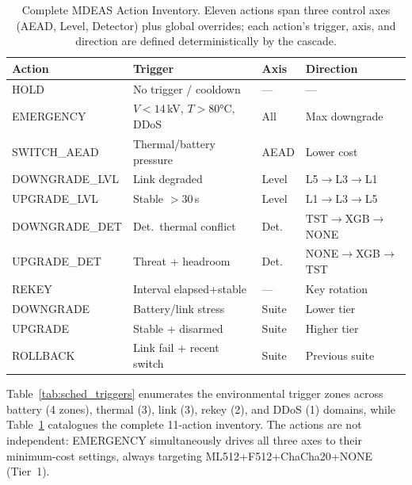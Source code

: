 \begin{table}[!t]
\centering
\caption{Complete MDEAS Action Inventory.
Eleven actions span three control axes (AEAD, Level, Detector) plus
global overrides; each action's trigger, axis, and direction are
defined deterministically by the cascade.}
\label{tab:sched_actions}
\footnotesize
\setlength{\tabcolsep}{2.5pt}
\begin{tabular}{@{}l>{\raggedright\arraybackslash}p{2.5cm}ll@{}}
\toprule
\textbf{Action} & \textbf{Trigger} & \textbf{Axis} & \textbf{Direction} \\
\midrule
HOLD            & No trigger / cooldown    & ---   & --- \\
EMERGENCY       & $V<14$\,kV, $T>80$°C, DDoS & All & Max downgrade \\
SWITCH\_AEAD    & Thermal/battery pressure & AEAD  & Lower cost \\
DOWNGRADE\_LVL  & Link degraded            & Level & L5$\to$L3$\to$L1 \\
UPGRADE\_LVL    & Stable $>30$\,s          & Level & L1$\to$L3$\to$L5 \\
DOWNGRADE\_DET  & Det.\ thermal conflict   & Det.  & TST$\to$XGB$\to$NONE \\
UPGRADE\_DET    & Threat + headroom        & Det.  & NONE$\to$XGB$\to$TST \\
REKEY           & Interval elapsed+stable  & ---   & Key rotation \\
DOWNGRADE       & Battery/link stress      & Suite & Lower tier \\
UPGRADE         & Stable + disarmed        & Suite & Higher tier \\
ROLLBACK        & Link fail + recent switch& Suite & Previous suite \\
\bottomrule
\end{tabular}
\end{table}

Table~\ref{tab:sched_triggers} enumerates the environmental trigger
zones across battery (4 zones), thermal (3), link (3), rekey (2), and
DDoS (1) domains, while Table~\ref{tab:sched_actions} catalogues the
complete 11-action inventory.  The actions are not independent:
EMERGENCY simultaneously drives all three axes to their minimum-cost
settings, always targeting ML512+F512+ChaCha20+NONE (Tier~1).

